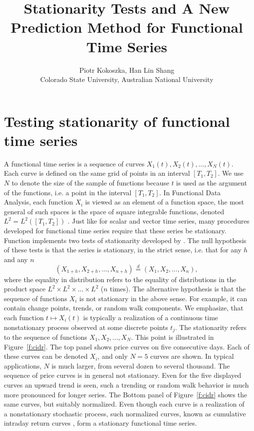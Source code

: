 \documentclass[nojss]{jss}
\author{\hspace{-.2in} Piotr Kokoszka, \hspace{0.9in} Han Lin Shang\\Colorado State University, \hspace{.2in} Australian National University}
\title{Stationarity Tests and A New Prediction Method for Functional Time Series}
\def\eqd{\stackrel{\mbox{$\scriptstyle  d$}}{=}}
\begin{document}
  

\section{Testing stationarity of functional time series}

A functional time series is a sequence of curves $X_1(t), X_2(t), \ldots, X_N(t)$. Each curve is defined on the same grid of points in an  interval $[T_1, T_2]$. We use $N$ to denote the size of the sample of functions because $t$ is used as the argument of the functions, i.e. a point in the interval $[T_1, T_2]$. In Functional Data Analysis, each function $X_i$ is viewed as an element of a function space, the most general of such spaces is the space of square integrable functions, denoted $L^2 = L^2([T_1, T_2])$ \citep[see e.g.,][Chapter 2]{HKbook}. Just like for scalar and vector time series, many procedures developed for functional time series require that these series be stationary. Function  implements two tests of stationarity developed by \cite{HKR14}. The null hypothesis of these tests is that the series is stationary, in the  strict sense, i.e. that for any $h$ and any $n$ 
\begin{equation}
(X_{1+h}, X_{2+h}, \ldots, X_{n+h}) \eqd (X_{1}, X_{2}, \ldots, X_{n}),
\end{equation}
where the equality in distribution refers to the equality of distributions in the product space $L^2 \times L^2 \times \ldots \times  L^2$ ($n$ times). The alternative hypothesis is that the sequence of functions $X_i$ is not stationary in the above sense. For example, it can contain change points, trends, or random walk components. We emphasize, that each function $t \mapsto X_i(t)$ is typically a realization of a continuous time nonstationary process observed at some discrete points $t_j$. The stationarity refers to the sequence of functions $X_1, X_2, \ldots, X_N$. This point is illustrated in Figure~\ref{f:cidr}. The top panel shows price curves on five consecutive days. Each of these curves can be denoted $X_i$, and only $N=5$ curves are shown. In typical applications,  $N$ is much larger, from several dozen to several thousand. The sequence of price curves is in general not stationary. Even for the five displayed curves an upward trend is seen, such a trending or random walk behavior is much more pronounced for longer series. The Bottom panel of Figure~\ref{f:cidr} shows the same curves, but suitably normalized. Even though each curve is a realization of a nonstationary stochastic process, such normalized curves, known as cumulative intraday return curves \citep[see][and references therein]{kokoszka:miao:zhang:2015}, form a stationary functional time series. 
\end{document}
